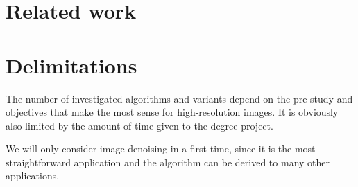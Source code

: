 \section{Related work}



\section{Delimitations}

The number of investigated algorithms and variants depend on the pre-study and objectives that make the most sense for high-resolution images.
It is obviously also limited by the amount of time given to the degree project.

We will only consider image denoising in a first time, since it is the most straightforward application and the algorithm can be derived to many other applications.
